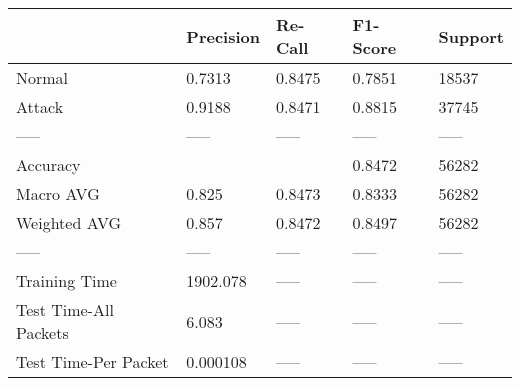 \begin{tabular}{lllll}
\toprule
{} & Precision & Re-Call & F1-Score & Support \\
\midrule
Normal                &    0.7313 &  0.8475 &   0.7851 &   18537 \\
Attack                &    0.9188 &  0.8471 &   0.8815 &   37745 \\
-----                 &     ----- &   ----- &    ----- &   ----- \\
Accuracy              &           &         &   0.8472 &   56282 \\
Macro AVG             &     0.825 &  0.8473 &   0.8333 &   56282 \\
Weighted AVG          &     0.857 &  0.8472 &   0.8497 &   56282 \\
-----                 &     ----- &   ----- &    ----- &   ----- \\
Training Time         &  1902.078 &   ----- &    ----- &   ----- \\
Test Time-All Packets &     6.083 &   ----- &    ----- &   ----- \\
Test Time-Per Packet  &  0.000108 &   ----- &    ----- &   ----- \\
\bottomrule
\end{tabular}
